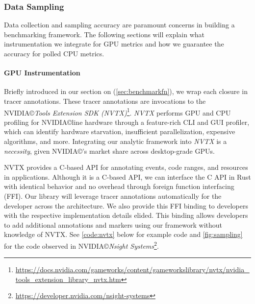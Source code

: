\subsubsection{Data Sampling}
Data collection and sampling accuracy are paramount concerns in building a benchmarking framework. The following sections will explain what instrumentation we integrate for GPU metrics and how we guarantee the accuracy for polled CPU metrics.

\paragraph{GPU Instrumentation}
Briefly introduced in our section on  (\cref{sec:benchmarkfn}), we wrap each closure in tracer annotations. These tracer annotations are invocations to the NVIDIA\copyright \textit{Tools Extension SDK (NVTX)}\footnote{\href{https://docs.nvidia.com/gameworks/content/gameworkslibrary/nvtx/nvidia_tools_extension_library_nvtx.htm}{https://docs.nvidia.com/gameworks/content/gameworkslibrary/nvtx/nvidia\_tools\_extension\_library\_nvtx.htm}}. \textit{NVTX} performs GPU and CPU profiling for NVIDIA\copyright line hardware through a feature-rich CLI and GUI profiler, which can identify hardware starvation, insufficient parallelization, expensive algorithms, and more. Integrating our analytic framework into \textit{NVTX} is a \emph{necessity}, given NVIDIA\copyright's market share across desktop-grade GPUs.\medskip

NVTX provides a C-based API for annotating events, code ranges, and resources in applications. Although it is a C-based API, we can interface the C API in Rust with identical behavior and no overhead through foreign function interfacing (FFI)\cite{Crichton15}. Our library will leverage tracer annotations automatically for the developer across the architecture. We also provide this FFI binding to developers with the respective implementation details elided. This binding allows developers to add additional annotations and markers using our framework without knowledge of NVTX. See \cref{code:nvtx} below for example code and \cref{fig:sampling} for the code observed in NVIDIA\copyright \textit{Nsight Systems}\footnote{\href{https://developer.nvidia.com/nsight-systems}{https://developer.nvidia.com/nsight-systems}}.

